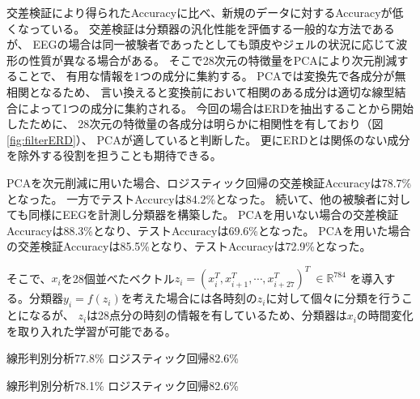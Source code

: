 交差検証により得られたAccuracyに比べ、新規のデータに対するAccuracyが低くなっている。
交差検証は分類器の汎化性能を評価する一般的な方法であるが、
EEGの場合は同一被験者であったとしても頭皮やジェルの状況に応じて波形の性質が異なる場合がある。
そこで28次元の特徴量をPCAにより次元削減することで、
有用な情報を1つの成分に集約する。
PCAでは変換先で各成分が無相関となるため、
言い換えると変換前において相関のある成分は適切な線型結合によって1つの成分に集約される。
今回の場合はERDを抽出することから開始したために、
28次元の特徴量の各成分は明らかに相関性を有しており（図\ref{fig:filterERD}）、
PCAが適していると判断した。
更にERDとは関係のない成分を除外する役割を担うことも期待できる。

PCAを次元削減に用いた場合、ロジスティック回帰の交差検証Accuracyは78.7\%となった。
一方でテストAccurcyは84.2\%となった。
続いて、他の被験者に対しても同様にEEGを計測し分類器を構築した。
PCAを用いない場合の交差検証Accuracyは88.3\%となり、テストAccuracyは69.6\%となった。
PCAを用いた場合の交差検証Accuracyは85.5\%となり、テストAccuracyは72.9\%となった。

そこで、\(x_i\)を28個並べたベクトル\(z_i=(x_i^T, x_{i+1}^T,\cdots, x_{i+27}^T)^T\ \in \mathbb R^{784}\)
を導入する。分類器\(y_i=f(z_i)\)を考えた場合には各時刻の\(z_i\)に対して個々に分類を行うことになるが、
\(z_i\)は28点分の時刻の情報を有しているため、分類器は\(x_i\)の時間変化を取り入れた学習が可能である。

線形判別分析77.8\%
ロジスティック回帰82.6\%

線形判別分析78.1\%
ロジスティック回帰82.6\%